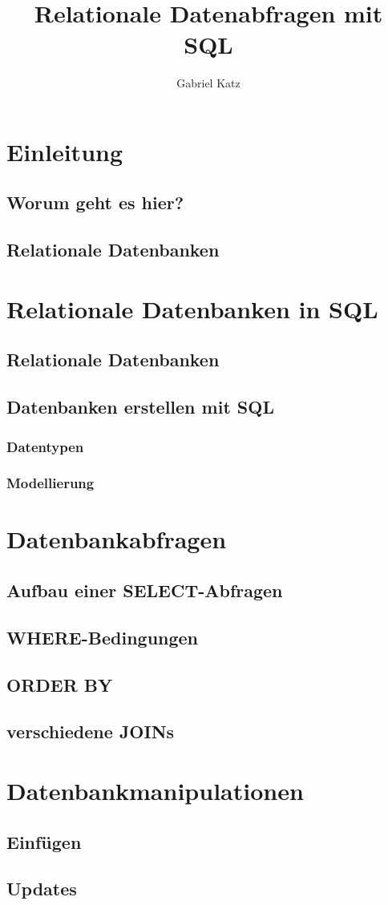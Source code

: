 \documentclass[12pt,a4paper]{report}
\title{Relationale Datenabfragen mit SQL}
\author{Gabriel Katz}
\theoremstyle{break}
\theoremstyle{plain}
\begin{document}
\maketitle
\tableofcontents
\chapter{Einleitung}

\section{Worum geht es hier?}
\section{Relationale Datenbanken}
\newpage
\chapter{Relationale Datenbanken in SQL}
\section{Relationale Datenbanken}
\section{Datenbanken erstellen mit SQL}
\subsection{Datentypen}
\subsection{Modellierung}
\chapter{Datenbankabfragen}
\section{Aufbau einer SELECT-Abfragen}
\section{WHERE-Bedingungen}
\section{ORDER BY}
\section{verschiedene JOINs}

\chapter{Datenbankmanipulationen}
\section{Einf\"{u}gen}
\section{Updates}
\end{document}
